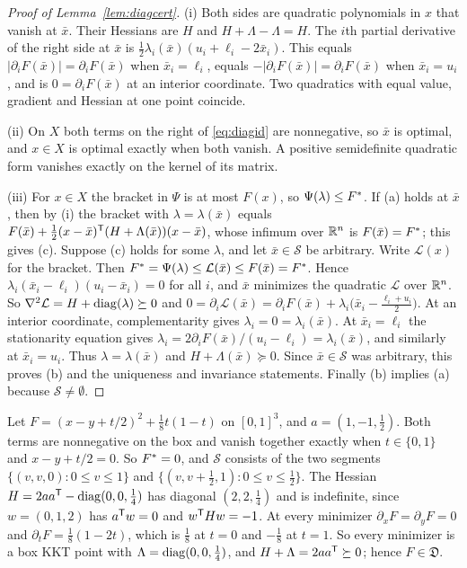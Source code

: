 \begin{proof}[Proof of Lemma~\ref{lem:diagcert}]
(i) Both sides are quadratic polynomials in $x$ that vanish at $\bar x$.
Their Hessians are $H$ and $H+\Lambda-\Lambda=H$. The $i$th partial
derivative of the right side at $\bar x$ is
$\frac12\lambda_i(\bar x)(u_i+\ell_i-2\bar x_i)$. This equals
$|\partial_iF(\bar x)|=\partial_iF(\bar x)$ when $\bar x_i=\ell_i$, equals
$-|\partial_iF(\bar x)|=\partial_iF(\bar x)$ when $\bar x_i=u_i$, and is
$0=\partial_iF(\bar x)$ at an interior coordinate. Two quadratics with equal
value, gradient and Hessian at one point coincide.

(ii) On $X$ both terms on the right of \eqref{eq:diagid} are nonnegative,
so $\bar x$ is optimal, and $x\in X$ is optimal exactly when both vanish. A
positive semidefinite quadratic form vanishes exactly on the kernel of its
matrix.

(iii) For $x\in X$ the bracket in $\Psi$ is at most $F(x)$, so
$\Psi(\lambda)\le F^{*}$. If (a) holds at $\bar x$, then by (i) the bracket
with $\lambda=\lambda(\bar x)$ equals
$F(\bar x)+\frac12(x-\bar x)^{\mathsf T}(H+\Lambda(\bar x))(x-\bar x)$, whose
infimum over $\mathbb R^n$ is $F(\bar x)=F^{*}$; this gives (c). Suppose (c) holds
for some $\lambda$, and let $\bar x\in\mathcal S$ be arbitrary. Write
$\mathcal L(x)$ for the bracket. Then
$F^{*}=\Psi(\lambda)\le\mathcal L(\bar x)\le F(\bar x)=F^{*}$. Hence
$\lambda_i(\bar x_i-\ell_i)(u_i-\bar x_i)=0$ for all $i$, and $\bar x$
minimizes the quadratic $\mathcal L$ over $\mathbb R^n$. So
$\nabla^2\mathcal L=H+\operatorname{diag}(\lambda)\succeq0$ and
$0=\partial_i\mathcal L(\bar x)=\partial_iF(\bar x)+\lambda_i\bigl(\bar x_i-\tfrac{\ell_i+u_i}2\bigr)$.
At an interior coordinate, complementarity gives
$\lambda_i=0=\lambda_i(\bar x)$. At $\bar x_i=\ell_i$ the stationarity
equation gives $\lambda_i=2\partial_iF(\bar x)/(u_i-\ell_i)=\lambda_i(\bar x)$,
and similarly at $\bar x_i=u_i$. Thus $\lambda=\lambda(\bar x)$ and
$H+\Lambda(\bar x)\succeq0$. Since $\bar x\in\mathcal S$ was arbitrary, this
proves (b) and the uniqueness and invariance statements. Finally (b) implies
(a) because $\mathcal S\ne\emptyset$.
\end{proof}

\begin{example}\label{ex:diagtilt}
Let $F=(x-y+t/2)^2+\frac18t(1-t)$ on $[0,1]^3$, and $a=(1,-1,\frac12)$. Both
terms are nonnegative on the box and vanish together exactly when
$t\in\{0,1\}$ and $x-y+t/2=0$. So $F^{*}=0$, and $\mathcal S$ consists of the
two segments $\{(v,v,0):0\le v\le1\}$ and $\{(v,v+\frac12,1):0\le
v\le\frac12\}$. The Hessian $H=2aa^{\mathsf T}-\operatorname{diag}(0,0,\frac14)$ has diagonal
$(2,2,\frac14)$ and is indefinite, since $w=(0,1,2)$ has $a^{\mathsf T}w=0$ and
$w^{\mathsf T}Hw=-1$. At every minimizer $\partial_xF=\partial_yF=0$ and
$\partial_tF=\frac18(1-2t)$, which is $\frac18$ at $t=0$ and $-\frac18$ at
$t=1$. So every minimizer is a box KKT point with
$\Lambda=\operatorname{diag}(0,0,\frac14)$, and $H+\Lambda=2aa^{\mathsf T}\succeq0$; hence
$F\in\mathfrak D$.
\end{example}

